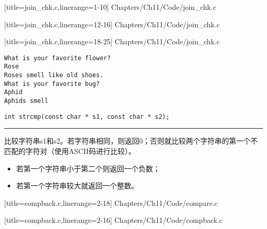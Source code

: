 \begin{frame}[fragile]

[title=join\_chk.c,linerange={1-10}]
{Chapters/Ch11/Code/join_chk.c}
\end{frame}

\begin{frame}[fragile]

[title=join\_chk.c,linerange={12-16}]
{Chapters/Ch11/Code/join_chk.c}
\end{frame}

\begin{frame}[fragile]

[title=join\_chk.c,linerange={18-25}]
{Chapters/Ch11/Code/join_chk.c}
\end{frame}

\begin{frame}[fragile]
\begin{lstlisting}[basicstyle=\ttfamily]
What is your favorite flower?
Rose
Roses smell like old shoes.
What is your favorite bug?
Aphid
Aphids smell
\end{lstlisting}

\end{frame}

\begin{frame}[fragile] 
\begin{lstlisting}[title=strcmp函数原型, basicstyle=\ttfamily]
int strcmp(const char * s1, const char * s2);
\end{lstlisting}
\rule{\textwidth}{0.3mm} \vspace{0.3mm}

比较字符串s1和s2。若字符串相同，则返回0；否则就比较两个字符串的第一个不匹配的字符对（使用ASCII码进行比较）。\vspace{.05in}

\begin{itemize}
\item
若第一个字符串小于第二个则返回一个负数；
\item
若第一个字符串较大就返回一个整数。
\end{itemize}
\end{frame}

\begin{frame}[fragile]

[title=compback.c,linerange={2-18}]
{Chapters/Ch11/Code/compare.c}
\end{frame}

\begin{frame}[fragile]

[title=compback.c,linerange={2-16}]
{Chapters/Ch11/Code/compback.c}
\end{frame}

